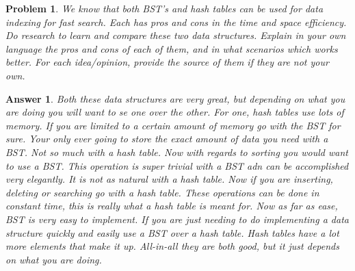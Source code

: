 \documentclass[11pt]{article}
\newtheorem{problem}{Problem}
\newtheorem{answer}{Answer}
\begin{document}
\bigskip
 
\begin{problem}
 \label{prob:4} We know that both BST's and hash tables can be used for data indexing for fast search. Each has pros and cons in the time and space efficiency. Do research to learn and compare these two data structures. Explain in your own language the pros and cons of each of them, and in what scenarios which works better. For each idea/opinion, provide the source of them if they are not your own.
\end{problem}

\begin{answer}
 \label{ans:4} Both these data structures are very great, but depending on what you are doing you will want to se one over the other. For one, hash tables use lots of memory. If you are limited to a certain amount of memory go with the BST for sure. Your only ever going to store the exact amount of data you need with a BST. Not so much with a hash table. Now with regards to sorting you would want to use a BST. This operation is super trivial with a BST adn can be accomplished very elegantly. It is not as natural with a hash table. Now if you are inserting, deleting or searching go with a hash table. These operations can be done in constant time, this is really what a hash table is meant for. Now as far as ease, BST is very easy to implement. If you are just needing to do implementing a data structure quickly and easily use a BST over a hash table. Hash tables have a lot more elements that make it up. All-in-all they are both good, but it just depends on what you are doing.
\end{answer}
\end{document}
